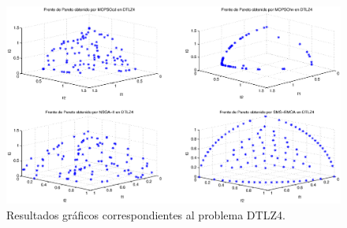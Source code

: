 \clearpage
\newpage

\begin{figure}
      \begin{center}
	  \includegraphics[scale=0.45]{Cap4/rdtlz4r.eps}
      \end{center}
	\caption{Resultados gr\'aficos correspondientes al problema DTLZ4.}
      \label{fig:rDTLZ4}
   \end{figure}

   \clearpage
   \newpage

